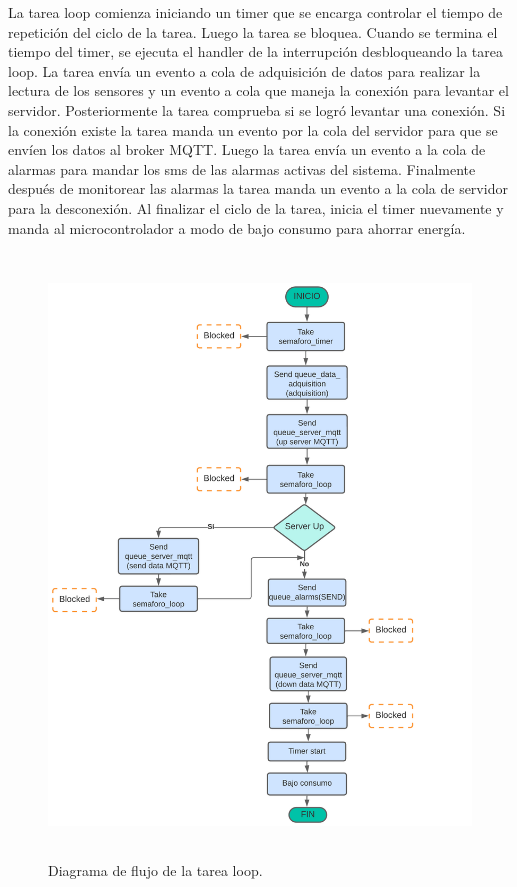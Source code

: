 La tarea loop comienza iniciando un timer que se encarga controlar el tiempo de repetición del ciclo de la tarea. Luego la tarea se bloquea. 
Cuando se termina el tiempo del timer, se ejecuta el handler de la interrupción desbloqueando la tarea loop. La tarea envía un evento a cola de adquisición de datos para realizar la lectura  de  los sensores y un evento a cola que maneja la conexión  para levantar el servidor. Posteriormente la tarea comprueba si se logró levantar una conexión. Si la conexión existe la tarea manda un evento  por la cola del servidor para que se envíen los datos al broker MQTT. Luego la tarea  envía un evento a la cola de alarmas para mandar los sms de las alarmas activas del sistema. Finalmente después de monitorear  las alarmas la tarea manda un evento a la cola de servidor para la desconexión. Al finalizar el ciclo de la tarea, inicia el timer nuevamente y manda al microcontrolador a modo de bajo consumo para ahorrar energía.

\begin{figure}[h]  
\centering
	\includegraphics[width=12cm, height=16cm]{./Figures/DF task loop.png}
	\caption{Diagrama de flujo de la tarea loop.}
	\label{fig:Df tarea loop sistema}
\end{figure}

